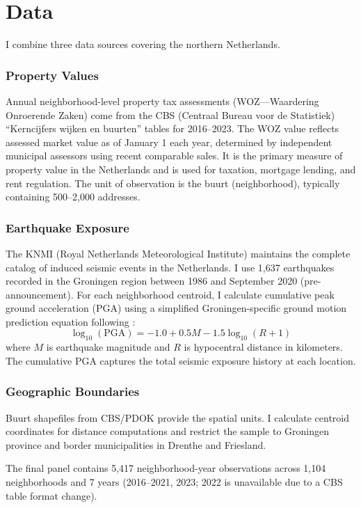 \documentclass[12pt]{article}
\begin{document}
\section{Data}

I combine three data sources covering the northern Netherlands.

\subsubsection*{Property Values} Annual neighborhood-level property tax assessments (WOZ---Waardering Onroerende Zaken) come from the CBS (Centraal Bureau voor de Statistiek) ``Kerncijfers wijken en buurten'' tables for 2016--2023. The WOZ value reflects assessed market value as of January 1 each year, determined by independent municipal assessors using recent comparable sales. It is the primary measure of property value in the Netherlands and is used for taxation, mortgage lending, and rent regulation. The unit of observation is the buurt (neighborhood), typically containing 500--2,000 addresses.

\subsubsection*{Earthquake Exposure} The KNMI (Royal Netherlands Meteorological Institute) maintains the complete catalog of induced seismic events in the Netherlands. I use 1,637 earthquakes recorded in the Groningen region between 1986 and September 2020 (pre-announcement). For each neighborhood centroid, I calculate cumulative peak ground acceleration (PGA) using a simplified Groningen-specific ground motion prediction equation following \citet{bommer2017}:
\[
\log_{10}(\text{PGA}) = -1.0 + 0.5M - 1.5\log_{10}(R + 1)
\]
where $M$ is earthquake magnitude and $R$ is hypocentral distance in kilometers. The cumulative PGA captures the total seismic exposure history at each location.

\subsubsection*{Geographic Boundaries} Buurt shapefiles from CBS/PDOK provide the spatial units. I calculate centroid coordinates for distance computations and restrict the sample to Groningen province and border municipalities in Drenthe and Friesland.

The final panel contains 5,417 neighborhood-year observations across 1,104 neighborhoods and 7 years (2016--2021, 2023; 2022 is unavailable due to a CBS table format change).
\end{document}
